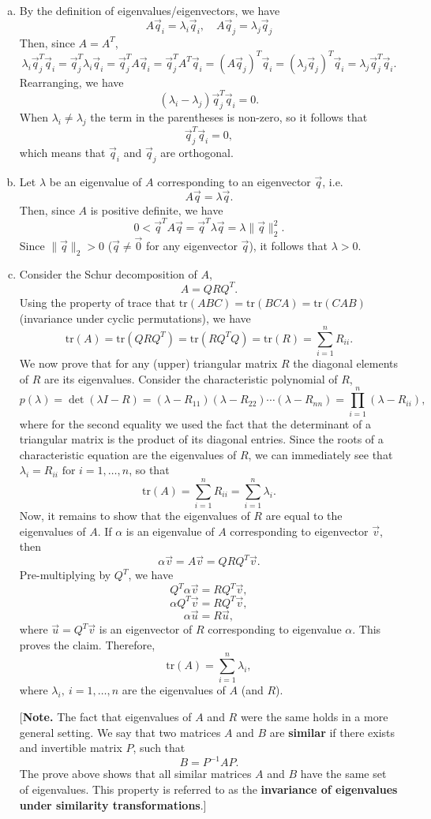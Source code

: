 \documentclass{article}
\newcommand{\al}{\alpha}
\newcommand{\la}{\lambda}
\newcommand{\normII}[1]{\|#1\|_2}
\newcommand{\inv}{^{-1}}
\newcommand{\tr}{\mathrm{tr}}
\newcommand{\tfor}{\text{ for }}
\begin{document}
\begin{enumerate}[(a)]
\item By the definition of eigenvalues/eigenvectors, we have
\[ A\vec q_i = \la_i \vec q_i, \quad A\vec q_j = \la_j \vec q_j \]
Then, since $A = A^T$, 
\[ \la_i \vec q_j^T \vec q_i = \vec q_j^T \la_i \vec q_i = \vec q_j^T A \vec q_i = \vec q_j^T A^T \vec q_i = (A \vec q_j)^T \vec q_i = (\la_j \vec q_j)^T \vec q_i = \la_j \vec q_j^T \vec q_i. \]
Rearranging, we have
\[ (\la_i - \la_j) \vec q_j^T \vec q_i = 0. \]
When $\la_i \ne \la_j$ the term in the parentheses is non-zero, so it follows that
\[ \vec q_j^T \vec q_i = 0, \]
which means that $\vec q_i$ and $\vec q_j$ are orthogonal.

\item Let $\la$ be an eigenvalue of $A$ corresponding to an eigenvector $\vec q$, i.e.
\[ A\vec q = \la \vec q. \]
Then, since $A$ is positive definite, we have
\[ 0 < \vec q^T A \vec q = \vec q^T \la \vec q = \la \normII{\vec q}^2. \]
Since $\normII{\vec q} > 0$ ($\vec q \ne \vec 0$ for any eigenvector $\vec q$), it follows that $\la>0$.

\item Consider the Schur decomposition of $A$,
\[ A = QRQ^T. \]
Using the property of trace that $\tr(ABC) = \tr(BCA) = \tr(CAB)$ (invariance under cyclic permutations), we have
\[ \tr(A) = \tr(QRQ^T) = \tr(RQ^TQ) = \tr(R) = \sum_{i=1}^n R_{ii}. \]
We now prove that for any (upper) triangular matrix $R$ the diagonal elements of $R$ are its eigenvalues. Consider the characteristic polynomial of $R$,
\[ p(\la) = \det(\la I - R) = (\la-R_{11})(\la-R_{22})\cdots(\la-R_{nn}) = \prod_{i=1}^n (\la-R_{ii}), \]
where for the second equality we used the fact that the determinant of a triangular matrix is the product of its diagonal entries.
Since the roots of a characteristic equation are the eigenvalues of $R$, we can immediately see that $\la_i = R_{ii}\tfor i=1,\dots, n$, so that
\[ \tr(A) = \sum_{i=1}^n R_{ii} = \sum_{i=1}^n \la_i. \]
Now, it remains to show that the eigenvalues of $R$ are equal to the eigenvalues of $A$.
If $\al$ is an eigenvalue of $A$ corresponding to eigenvector $\vec v$, then
\[ \al \vec v = A \vec v = QRQ^T \vec v. \]
Pre-multiplying by $Q^T$, we have
\[ Q^T \al \vec v = RQ^T \vec v, \]
\[ \al Q^T \vec v = RQ^T \vec v, \]
\[ \al \vec u = R \vec u, \]
where $\vec u = Q^T \vec v$ is an eigenvector of $R$ corresponding to eigenvalue $\al$. This proves the claim. Therefore,
\[ \tr(A) = \sum_{i=1}^n \la_i, \]
where $\la_i,\ i=1,\dots, n$ are the eigenvalues of $A$ (and $R$).

[{\bf Note.} The fact that eigenvalues of $A$ and $R$ were the same holds in a more general setting. We say that two matrices $A$ and $B$ are {\bf similar} if there exists and invertible matrix $P$, such that 
\[ B = P\inv A P. \]
The prove above shows that all similar matrices $A$ and $B$ have the same set of eigenvalues. This property is referred to as the {\bf invariance of eigenvalues under similarity transformations}.]
\end{enumerate}
\end{document}
